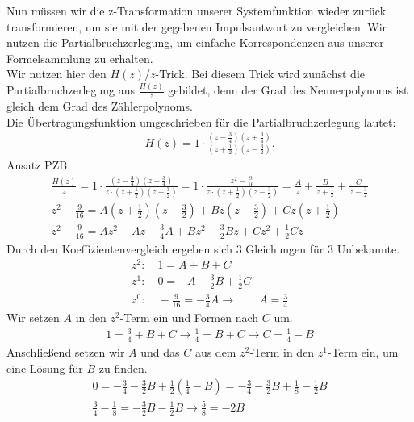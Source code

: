 \documentclass[11pt,a4paper,DIV=12]{scrartcl}
\begin{document}
Nun müssen wir die z-Transformation unserer Systemfunktion wieder zurück 
transformieren, um sie mit der gegebenen Impulsantwort zu vergleichen. 
%
Wir nutzen die Partialbruchzerlegung, um einfache Korrespondenzen aus unserer
Formelsammlung zu erhalten.\\
%
Wir nutzen hier den $H(z)$/$z$-Trick. 
%
Bei diesem Trick wird zunächst die Partialbruchzerlegung aus $\frac{H(z)}{z}$
%
gebildet, denn der Grad des Nennerpolynoms ist gleich dem Grad des 
Zählerpolynoms.\\
%
Die Übertragungsfunktion umgeschrieben für die Partialbruchzerlegung lautet:
%
\begin{gather}
	H(z) = 1 \cdot \frac{\left(z - \frac{3}{4}\right)\left(z + \frac{3}{4}\right)}
	{\left(z+\frac{1}{2}\right)\left(z-\frac{3}{2}\right)}.
\end{gather}
%
Ansatz PZB
%
%
%
\begin{gather}
	\frac{H(z)}{z} = 
	1 \cdot \frac{\left(z - \frac{3}{4}\right)\left(z + \frac{3}{4}\right)}
	{z \cdot \left(z+\frac{1}{2}\right)\left(z-\frac{3}{2}\right)} 
	=1 \cdot \frac{z^2 - \frac{9}{16}}{z \cdot \left(z+\frac{1}{2}\right)\left(z-\frac{3}{2}\right)} 
	=\frac{A}{z} + \frac{B}{z+\frac{1}{2}} + \frac{C}{z-\frac{3}{2}}\\
	z^2 - \frac{9}{16} 
	=A \left(z+\frac{1}{2}\right)\left(z-\frac{3}{2}\right) 
	+ B z \left(z-\frac{3}{2}\right) + C z \left(z+\frac{1}{2}\right)\\
	z^2 - \frac{9}{16} 
	=A z^2 - A z - \frac{3}{4} A + B z^2 - \frac{3}{2} B z + C z^2 + \frac{1}{2} C z
\end{gather}
%
%
%
Durch den Koeffizientenvergleich ergeben sich $3$ Gleichungen für $3$ 
Unbekannte.
%
%
\begin{gather}
	z^2:\quad 1 = A+B+C\\
	z^1:\quad 0 = -A -\frac{3}{2}B + \frac{1}{2}C\\
	z^0:\quad -\frac{9}{16} = -\frac{3}{4}A \rightarrow \qquad A = \frac{3}{4}
\end{gather}
%
%
Wir setzen $A$ in den $z^2$-Term ein und Formen nach $C$ um.
%
%
\begin{gather}
	1 = \frac{3}{4}+B+C \rightarrow \frac{1}{4} = B + C \rightarrow C = \frac{1}{4} - B
\end{gather}
%
%
Anschließend setzen wir $A$ und das $C$ aus dem $z^2$-Term in den $z^1$-Term
ein, um eine Lösung für $B$ zu finden.
%
\begin{gather}
	0 = - \frac{3}{4} -\frac{3}{2}B + \frac{1}{2} (\frac{1}{4} - B) 
	=- \frac{3}{4} -\frac{3}{2}B + \frac{1}{8} - \frac{1}{2} B\\
	\frac{3}{4} - \frac{1}{8} =  - \frac{3}{2}B - \frac{1}{2} B \rightarrow\frac{5}{8} =  -  2 B
\end{gather}
\end{document}
